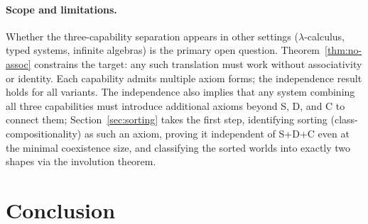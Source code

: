 \documentclass[sigconf,screen]{acmart}
\theoremstyle{remark}
\begin{document}
\paragraph{Scope and limitations.}
Whether the three-capability separation appears in other settings ($\lambda$-calculus, typed systems, infinite algebras) is the primary open question. Theorem~\ref{thm:no-assoc} constrains the target: any such translation must work without associativity or identity. Each capability admits multiple axiom forms; the independence result holds for all variants. The independence also implies that any system combining all three capabilities must introduce additional axioms beyond S, D, and C to connect them; Section~\ref{sec:sorting} takes the first step, identifying sorting (class-compositionality) as such an axiom, proving it independent of S+D+C even at the minimal coexistence size, and classifying the sorted worlds into exactly two shapes via the involution theorem.

\section{Conclusion}
\end{document}
